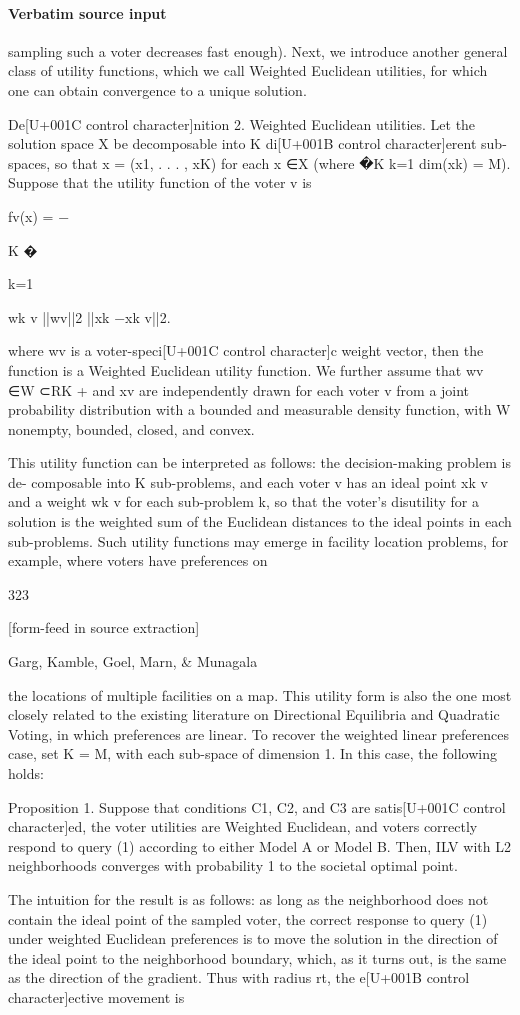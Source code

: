 \documentclass[10pt]{article}
\begin{document}
\paragraph{Verbatim source input}
\begin{ReviewVerbatim}
sampling such a voter decreases fast enough).
Next, we introduce another general class of utility functions, which we call Weighted
Euclidean utilities, for which one can obtain convergence to a unique solution.

De[U+001C control character]nition 2. Weighted Euclidean utilities. Let the solution space X be decomposable
into K di[U+001B control character]erent sub-spaces, so that x = (x1, . . . , xK) for each x ∈X (where �K
k=1 dim(xk) =
M). Suppose that the utility function of the voter v is

fv(x) = −

K
�

k=1

wk
v
||wv||2
||xk −xk
v||2.

where wv is a voter-speci[U+001C control character]c weight vector, then the function is a Weighted Euclidean utility
function. We further assume that wv ∈W ⊂RK
+ and xv are independently drawn for each
voter v from a joint probability distribution with a bounded and measurable density function,
with W nonempty, bounded, closed, and convex.

This utility function can be interpreted as follows: the decision-making problem is de-
composable into K sub-problems, and each voter v has an ideal point xk
v and a weight wk
v
for each sub-problem k, so that the voter's disutility for a solution is the weighted sum of
the Euclidean distances to the ideal points in each sub-problems. Such utility functions
may emerge in facility location problems, for example, where voters have preferences on

323


[form-feed in source extraction]

Garg, Kamble, Goel, Marn, & Munagala

the locations of multiple facilities on a map. This utility form is also the one most closely
related to the existing literature on Directional Equilibria and Quadratic Voting, in which
preferences are linear. To recover the weighted linear preferences case, set K = M, with
each sub-space of dimension 1. In this case, the following holds:

Proposition 1. Suppose that conditions C1, C2, and C3 are satis[U+001C control character]ed, the voter utilities are
Weighted Euclidean, and voters correctly respond to query (1) according to either Model A
or Model B. Then, ILV with L2 neighborhoods converges with probability 1 to the societal
optimal point.

The intuition for the result is as follows: as long as the neighborhood does not contain
the ideal point of the sampled voter, the correct response to query (1) under weighted
Euclidean preferences is to move the solution in the direction of the ideal point to the
neighborhood boundary, which, as it turns out, is the same as the direction of the gradient.
Thus with radius rt, the e[U+001B control character]ective movement is
\end{ReviewVerbatim}
\end{document}
